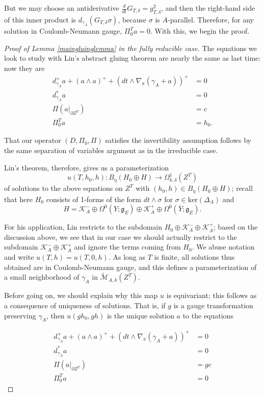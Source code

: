 \documentclass{memo-l}
\theoremstyle{definition}
\theoremstyle{remark}
\numberwithin{section}{chapter}
\numberwithin{equation}{chapter}
\begin{document}
But we may choose an antiderivative $\frac{d}{dt} G_{T,\delta} = g_{T,\delta}^2$, and then the right-hand side of this inner product is $d_{\gamma_A} (G_{T,\delta} \sigma)$, because $\sigma$ is $A$-parallel. Therefore, for any solution in Coulomb-Neumann gauge, $\Pi^T_0 a = 0$. With this, we begin the proof.

\begin{proof}[Proof of Lemma \ref{maingluinglemma} in the fully reducible case]The equations we look to study with Lin's abstract gluing theorem are nearly the same as last time: now they are 
\begin{align*}d_{\gamma_A}^+ a + (a \wedge a)^+ + \left(dt \wedge \nabla_\pi(\gamma_A + a)\right)^+ &= 0 \\
d_{\gamma_A}^* a &= 0 \\
\Pi (a \big|_{\partial Z^T}) &= c\\
\Pi_0^T a &= h_0.
\end{align*}

That our operator $(D, \Pi_0, \Pi)$ satisfies the invertibility assumption follows by the same separation of variables argument as in the irreducible case.

Lin's theorem, therefore, gives us a parameterization 
$$u(T, h_0, h): B_\eta(H_0 \oplus H) \to \Omega^1_{k,\delta}(Z^T)$$ 
of solutions to the above equations on $Z^T$ with $(h_0, h) \in B_\eta(H_0 \oplus H)$; recall that here $H_0$ consists of 1-forms of the form $dt \wedge \sigma$ for $\sigma \in \text{ker}(\Delta_A)$ and $$H = \mathcal K_A^- \oplus \Omega^0(Y; \mathfrak g_E) \oplus \mathcal K_A^+ \oplus \Omega^0(\overline Y; \mathfrak g_E).$$

For his application, Lin restricts to the subdomain $H_0 \oplus \mathcal K_A^- \oplus \mathcal K_A^+$; based on the discussion above, we see that in our case we should actually restrict to the subdomain $\mathcal K_A^- \oplus \mathcal K_A^+$ and ignore the terms coming from $H_0$. We abuse notation and write $u(T, h) = u(T, 0, h)$. As long as $T$ is finite, all solutions thus obtained are in Coulomb-Neumann gauge, and this defines a parameterization of a small neighborhood of $\gamma_A$ in $\widetilde{\mathcal M}_{A,k}(Z^T)$.

Before going on, we should explain why this map $u$ is equivariant; this follows as a consequence of uniqueness of solutions. That is, if $g$ is a gauge transformation preserving $\gamma_A$, then $u(gh_0, gh)$ is the unique solution $a$ to the equations

\begin{align*}d_{\gamma_A}^+ a + (a \wedge a)^+ + \left(dt \wedge \nabla_\pi(\gamma_A + a)\right)^+ &= 0 \\
d_{\gamma_A}^* a &= 0 \\
\Pi (a \big|_{\partial Z^T}) &= gc\\
\Pi_0^T a &= 0
\end{align*}


\end{proof}
\end{document}

